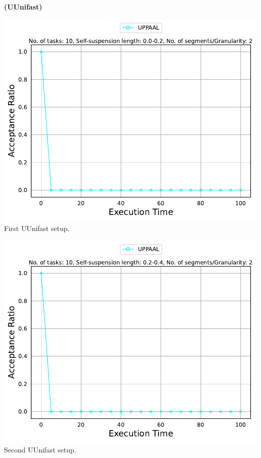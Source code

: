\documentclass[]{article}
\begin{document}
	\begin{minipage}[t]{0.48\linewidth}
		\centering
		\textbf{(UUnifast)}
		\vspace{0.3cm}
		
		\includegraphics[width=\linewidth]{UPPAAL[2][0.0-0.2][10].pdf}
		First UUnifast setup.
		\vspace{0.3cm}
		
		\includegraphics[width=\linewidth]{UPPAAL[2][0.2-0.4][10].pdf}
		Second UUnifast setup.
		\vspace{0.3cm}


\end{minipage}
\end{document}
